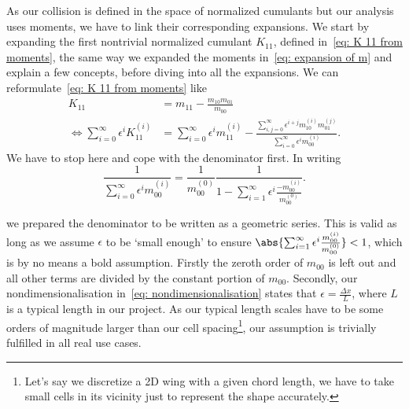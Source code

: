 As our collision is defined in the space of normalized cumulants but our analysis uses moments, we have to link their corresponding expansions.
We start by expanding the first nontrivial normalized cumulant $K_{11}$, defined in~\eqref{eq: K 11 from moments}, the same way we expanded the moments in~\eqref{eq: expansion of m} and explain a few concepts, before diving into all the expansions.
We can reformulate~\eqref{eq: K 11 from moments} like
\begin{equation}
  \label{eq: first expansion}
  \begin{aligned}
    K_{11} & = m_{11} - \frac{m_{10}m_{01}}{m_{00}}\\
    \Leftrightarrow
    \sum_{i=0}^\infty \epsilon^i K_{11}^{(i)}
    & = \sum_{i=0}^\infty \epsilon^i m_{11}^{(i)} -
    \frac{\sum_{i,j=0}^\infty \epsilon^{i+j} m_{10}^{(i)}m_{01}^{(j)}}
        {\sum_{i=0}^\infty \epsilon^i m_{00}^{(i)}}.
  \end{aligned}
\end{equation}
We have to stop here and cope with the denominator first.
In writing
\begin{equation}
  \frac{1}{\sum_{i=0}^\infty \epsilon^i m_{00}^{(i)}}=
  \frac{1}{m_{00}^{(0)}}
  \frac{1}{1 - \sum_{i=1}^\infty \epsilon^i \frac{ - m_{00}^{(i)}}{ m_{00}^{(0)}}}.
\end{equation}

we prepared the denominator to be written as a geometric series.
This is valid as long as we assume $\epsilon$ to be `small enough' to ensure $\abs{\sum_{i=1}^\infty \epsilon^i \frac{ m_{00}^{(i)}}{ m_{00}^{(0)}} } < 1$, which is by no means a bold assumption.
Firstly the zeroth order of $m_{00}$ is left out and all other terms are divided by the constant portion of $m_{00}$.
Secondly, our nondimensionalisation in~\eqref{eq: nondimensionalisation} states that $\epsilon = \frac{\Delta x}{L}$, where $L$ is a typical length in our project.
As our typical length scales have to be some orders of magnitude larger than our cell spacing\footnote{Let's say we discretize a 2D wing with a given chord length, we have to take small cells in its vicinity just to represent the shape accurately.}, our assumption is trivially fulfilled in all real use cases.

